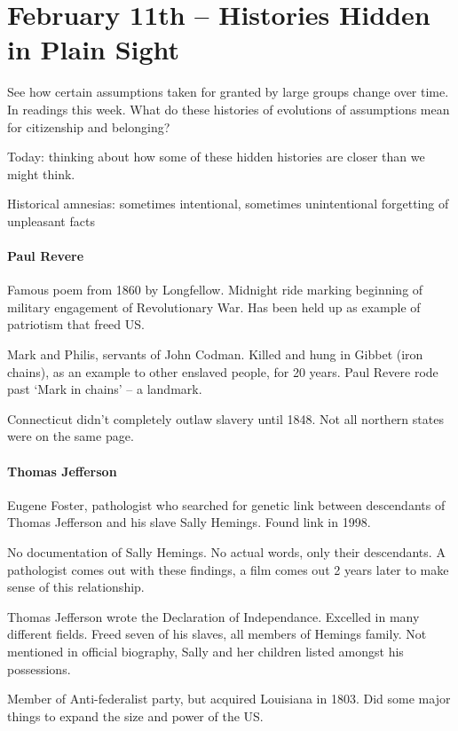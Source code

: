\section{February 11th -- Histories Hidden in Plain Sight}

See how certain assumptions taken for granted by large groups change over time. In readings this week. What do these histories of evolutions of assumptions mean for citizenship and belonging?

Today: thinking about how some of these hidden histories are closer than we might think.

Historical amnesias: sometimes intentional, sometimes unintentional forgetting of unpleasant facts

\paragraph{Paul Revere} Famous poem from 1860 by Longfellow. Midnight ride marking beginning of military engagement of Revolutionary War. Has been held up as example of patriotism that freed US.

Mark and Philis, servants of John Codman. Killed and hung in Gibbet (iron chains), as an example to other enslaved people, for 20 years. Paul Revere rode past `Mark in chains' -- a landmark.

Connecticut didn't completely outlaw slavery until 1848. Not all northern states were on the same page.

\paragraph{Thomas Jefferson} Eugene Foster, pathologist who searched for genetic link between descendants of Thomas Jefferson and his slave Sally Hemings. Found link in 1998.

No documentation of Sally Hemings. No actual words, only their descendants. A pathologist comes out with these findings, a film comes out 2 years later to make sense of this relationship.

Thomas Jefferson wrote the Declaration of Independance. Excelled in many different fields. Freed seven of his slaves, all members of Hemings family. Not mentioned in official biography, Sally and her children listed amongst his possessions.

Member of Anti-federalist party, but acquired Louisiana in 1803. Did some major things to expand the size and power of the US.

